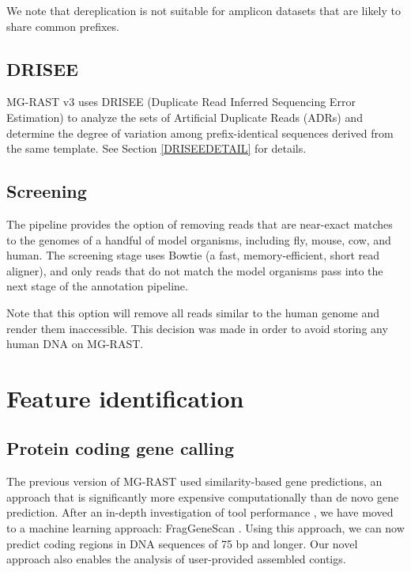 \documentclass[12pt,fullpage]{report}
\begin{document}
We note that dereplication is not suitable for amplicon datasets that are likely to share common prefixes.


\subsection*{DRISEE}
\label{section:DRISEE}
MG-RAST v3 uses DRISEE (Duplicate Read Inferred Sequencing Error Estimation) \cite{DRISEE} to analyze the sets of Artificial Duplicate Reads (\gls{ADR}s) \cite{ADRS} and determine the degree of variation among prefix-identical sequences derived from the same template. See Section \ref{DRISEEDETAIL} for details.

\subsection*{Screening}
The pipeline provides the option of removing reads that are near-exact matches to the genomes of a handful of model organisms, including fly, mouse, cow, and human. The screening stage uses Bowtie \cite{BOWTIE} (a fast, memory-efficient, short read aligner), and only reads that do not match the model organisms pass into the next stage of the annotation pipeline.

Note that this option will remove all reads similar to the human genome and render them inaccessible. This decision was made in order to avoid storing any human DNA on MG-RAST.

\section{Feature identification}

\subsection*{Protein coding gene calling}

The previous version of MG-RAST used similarity-based gene predictions, an approach that is significantly more expensive computationally than de novo gene prediction. After an in-depth investigation of tool performance \cite{TRIMBLE_SHORT}, we have moved to a machine learning approach: FragGeneScan \cite{FGS}. Using this approach, we can now predict coding regions in DNA sequences of 75 bp and longer. Our novel approach also enables the analysis of user-provided assembled contigs.
\end{document}
